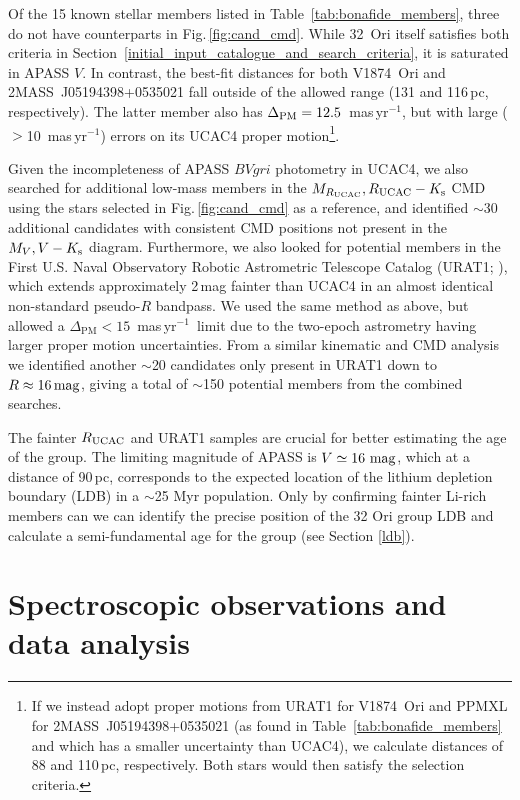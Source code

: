 \documentclass[usenatbib]{mnras}
\newcommand{\masyr}{mas\,yr$^{-1}$}
\begin{document}
Of the 15 known stellar members listed in
Table~\ref{tab:bonafide_members}, three do not have counterparts in
Fig.\,\ref{fig:cand_cmd}. While 32~Ori itself satisfies both criteria
in Section~\ref{initial_input_catalogue_and_search_criteria}, it is
saturated in APASS $V$. In contrast, the best-fit distances for both
V1874~Ori and 2MASS~J05194398+0535021 fall outside of the allowed
range (131 and 116\,pc, respectively). The latter member also has
$\Delta_{\rm PM}=12.5$~\masyr, but with large ($>$10~\masyr) errors on
its UCAC4 proper motion\footnote{If we instead adopt proper motions
  from URAT1 for V1874~Ori and PPMXL for 2MASS~J05194398+0535021 (as
  found in Table~\ref{tab:bonafide_members} and which has a smaller
  uncertainty than UCAC4), we calculate distances of 88 and 110\,pc,
  respectively. Both stars would then satisfy the selection
  criteria.}.

Given the incompleteness of APASS $BVgri$ photometry in UCAC4, we also
searched for additional low-mass members in the $M_{R_{\rm{UCAC}}},
R_{\rm{UCAC}}-K_{\rm{s}}$ CMD using the stars selected in
Fig.\,\ref{fig:cand_cmd} as a reference, and identified $\sim$30
additional candidates with consistent CMD positions not present in the
$M_{V}, V-K_{\rm{s}}$ diagram. Furthermore, we also looked for
potential members in the First U.S. Naval Observatory Robotic
Astrometric Telescope Catalog (URAT1; \citealp{Zacharias15}), which
extends approximately 2\,mag fainter than UCAC4 in an almost identical
non-standard pseudo-$R$ bandpass. We used the same method as above,
but allowed a $\Delta_{\mathrm{PM}}<15$~\masyr\ limit due to the
two-epoch astrometry having larger proper motion uncertainties. From
a similar kinematic and CMD analysis we identified another $\sim$20
candidates only present in URAT1 down to $R\approx16\,\rm{mag}$,
giving a total of $\sim$150 potential members from the combined
searches.

The fainter $R_{\rm{UCAC}}$ and URAT1 samples are crucial for better
estimating the age of the group. The limiting magnitude of APASS is $V
\simeq 16~\rm{mag}$, which at a distance of 90\,pc, corresponds to the
expected location of the lithium depletion boundary (LDB) in a
$\sim$25 Myr population. Only by confirming fainter Li-rich members
can we can identify the precise position of the 32 Ori group LDB and
calculate a semi-fundamental \citep{Soderblom14} age for the group
(see Section \ref{ldb}).

\section{Spectroscopic observations and data analysis}
\label{spectroscopic_observations}
\end{document}
